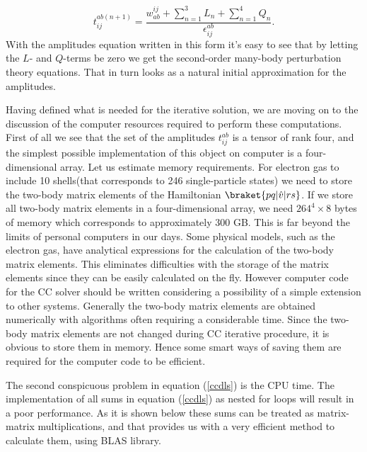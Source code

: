 \documentclass[twoside,english]{uiofysmaster}
\begin{document}
\begin{equation}\label{firsttarationamp}
t_{ij}^{ab(n+1)} = \frac{w_{ab}^{ij} + \sum_{n=1}^3L_n + \sum_{n=1}^4Q_n}{\epsilon_{ij}^{ab}}.
\end{equation}
With the amplitudes equation written in this form it's easy to see
that by letting the $L$- and $Q$-terms be zero we get the second-order
many-body perturbation theory equations. That in turn looks as a
natural initial approximation for the amplitudes.

Having defined what is needed for the iterative solution, we are
moving on to the discussion of the computer resources required to
perform these computations. First of all we see that the set of the
amplitudes $t_{ij}^{ab}$ is a tensor of rank four, and the simplest
possible implementation of this object on computer is a
four-dimensional array. Let us estimate memory requirements.  For
electron gas to include 10 shells(that corresponds to 246
single-particle states) we need to store the two-body matrix elements
of the Hamiltonian $\braket{pq|\hat{v}|rs}$. If we store all two-body
matrix elements in a four-dimensional array, we need $264^4 \times 8$
bytes of memory which corresponds to approximately 300 GB. This is far
beyond the limits of personal computers in our days. Some physical
models, such as the electron gas, have analytical expressions for the
calculation of the two-body matrix elements. This eliminates
difficulties with the storage of the matrix elements since they can be
easily calculated on the fly. However computer code for the CC solver
should be written considering a possibility of a simple extension to
other systems. Generally the two-body matrix elements are obtained
numerically with algorithms often requiring a considerable time. Since
the two-body matrix elements are not changed during CC iterative
procedure, it is obvious to store them in memory. Hence some smart
ways of saving them are required for the computer code to be
efficient.

The second conspicuous problem in equation (\ref{ccdls}) is the CPU
time. The implementation of all sums in equation (\ref{ccdls}) as
nested for loops will result in a poor performance. As it is shown
below these sums can be treated as matrix-matrix multiplications, and
that provides us with a very efficient method to calculate them, using
BLAS library\cite{GeijnScienceProgrammingMatrix2008}.
\end{document}
